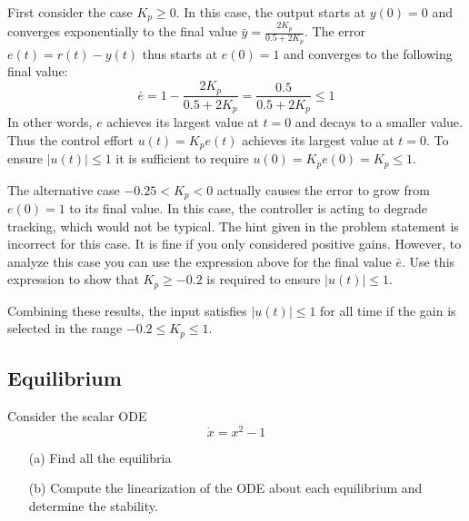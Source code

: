 \documentclass[12pt]{article}
\begin{document}
First consider the case \(K_p \geq 0\). In this case, the output starts at \(y(0) = 0\) and converges exponentially to the final value \(\bar{y} = \frac{2K_p}{0.5+2K_p}\). The error \(e(t) = r(t) - y(t)\) thus starts at \(e(0) = 1\) and converges to the following final value:
\begin{equation}
\bar{e} = 1 - \frac{2K_p}{0.5 + 2K_p} = \frac{0.5}{0.5 + 2K_p} \leq 1
\end{equation}
In other words, \(e\) achieves its largest value at \(t = 0\) and decays to a smaller value. Thus the control effort \(u(t) = K_pe(t)\) achieves its largest value at \(t = 0\). To ensure \(|u(t)| \leq 1\) it is sufficient to require \(u(0) = K_pe(0) = K_p \leq 1\).

The alternative case \(-0.25 < K_p < 0\) actually causes the error to grow from \(e(0) = 1\) to its final value. In this case, the controller is acting to degrade tracking, which would not be typical. The hint given in the problem statement is incorrect for this case. It is fine if you only considered positive gains. However, to analyze this case you can use the expression above for the final value \(\bar{e}\). Use this expression to show that \(K_p \geq -0.2\) is required to ensure \(|u(t)| \leq 1\).

Combining these results, the input satisfies \(|u(t)| \leq 1\) for all time if the gain is selected in the range \(-0.2 \leq K_p \leq 1\).

\clearpage
\subsection{Equilibrium}

Consider the scalar ODE
\begin{equation}
    \dot{x} = x^2-1
\end{equation}
\begin{enumerate}
    \item[(a)] Find all the equilibria
    \item[(b)] Compute the linearization of the ODE about each equilibrium and determine the stability.
\end{enumerate}
\end{document}
